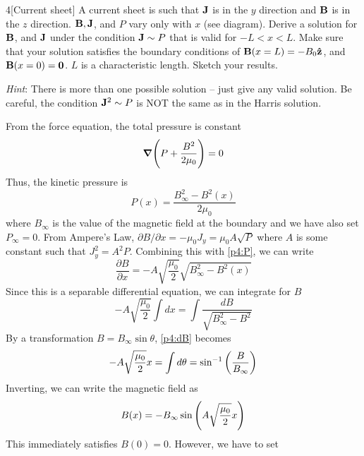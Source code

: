 \documentclass[12pt]{article}
\begin{document}
\begin{problem}{4}[Current sheet]
A current sheet is such that $\vb{J}$ is in the $y$ direction and $\vb{B}$ is in
the $z$ direction. $\vb{B},\vb{J}$, and $P$ vary only with $x$ (see diagram).
Derive a solution for $\vb{B}$, and $\vb{J}$ under the condition $\vb{J}\sim P$
that is valid for $-L<x<L$. Make sure that your solution satisfies the boundary
conditions of $\vb{B}(x=L)=-B_0\vb{\hat{z}}$, and $\vb{B}(x=0)=\vb{0}$. $L$
is a characteristic length. Sketch your results.

\textit{Hint}: There is more than one possible solution -- just give any valid
solution. Be careful, the condition $\vb{J}^2\sim P$ is NOT the same as in the
Harris solution. 
\begin{solution}
    From the force equation, the total pressure is constant
    \begin{equation}
        \grad\qty(P+\frac{B^2}{2\mu_0})=0 
    \end{equation}
    Thus, the kinetic pressure is
    \begin{equation}\label{p4:P}
        P(x)=\frac{B_\infty^2-B^2(x)}{2\mu_0}
    \end{equation}
    where $B_\infty$ is the value of the magnetic field at the boundary and we
    have also set $P_\infty=0$. From Ampere's Law, $\partial B/\partial
    x=-\mu_0J_y=\mu_0A\sqrt{P}$ where $A$ is some constant such that
    $J_y^2=A^2P$. Combining this with \eqref{p4:P}, we can write
    \begin{equation}
        \frac{\partial B}{\partial
        x}=-A\sqrt{\frac{\mu_0}{2}}\sqrt{B_\infty^2-B^2(x)} 
    \end{equation}
    Since this is a separable differential equation, we can integrate for $B$
    \begin{equation}\label{p4:dB}
        -A\sqrt{\frac{\mu_0}{2}}\int dx=\int\frac{dB}{\sqrt{B_\infty^2-B^2}} 
    \end{equation}
    By a transformation $B=B_\infty\sin\theta$, \eqref{p4:dB}
    becomes
    \begin{equation}
        -A\sqrt{\frac{\mu_0}{2}}x=\int d\theta=\sin^{-1}\qty(\frac{B}{B_\infty}) 
    \end{equation}
    Inverting, we can write the magnetic field as
    \begin{equation}
        B(x)=-B_\infty\sin\qty(A\sqrt{\frac{\mu_0}{2}}x) 
    \end{equation}
    This immediately satisfies $B(0)=0$. However, we have to set

\end{solution}
\end{problem}
\end{document}
